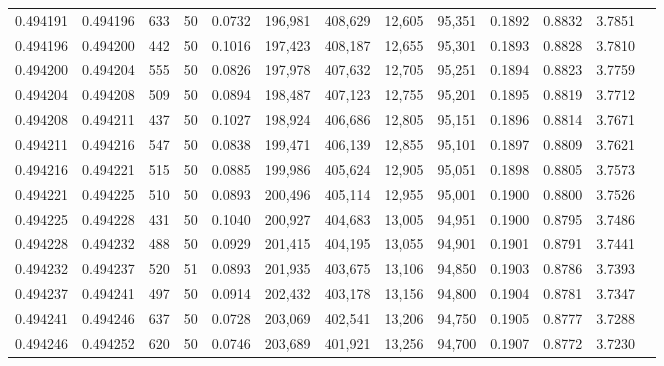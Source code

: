\begin{tabular}{rrrrrrrrrrrrr}
0.494191 & 0.494196 &   633 &  50 &                                     0.0732 & 196,981 & 408,629 &  12,605 &  95,351 & 0.1892 & 0.8832 & 3.7851 \\
0.494196 & 0.494200 &   442 &  50 &                                     0.1016 & 197,423 & 408,187 &  12,655 &  95,301 & 0.1893 & 0.8828 & 3.7810 \\
0.494200 & 0.494204 &   555 &  50 &                                     0.0826 & 197,978 & 407,632 &  12,705 &  95,251 & 0.1894 & 0.8823 & 3.7759 \\
0.494204 & 0.494208 &   509 &  50 &                                     0.0894 & 198,487 & 407,123 &  12,755 &  95,201 & 0.1895 & 0.8819 & 3.7712 \\
0.494208 & 0.494211 &   437 &  50 &                                     0.1027 & 198,924 & 406,686 &  12,805 &  95,151 & 0.1896 & 0.8814 & 3.7671 \\
0.494211 & 0.494216 &   547 &  50 &                                     0.0838 & 199,471 & 406,139 &  12,855 &  95,101 & 0.1897 & 0.8809 & 3.7621 \\
0.494216 & 0.494221 &   515 &  50 &                                     0.0885 & 199,986 & 405,624 &  12,905 &  95,051 & 0.1898 & 0.8805 & 3.7573 \\
0.494221 & 0.494225 &   510 &  50 &                                     0.0893 & 200,496 & 405,114 &  12,955 &  95,001 & 0.1900 & 0.8800 & 3.7526 \\
0.494225 & 0.494228 &   431 &  50 &                                     0.1040 & 200,927 & 404,683 &  13,005 &  94,951 & 0.1900 & 0.8795 & 3.7486 \\
0.494228 & 0.494232 &   488 &  50 &                                     0.0929 & 201,415 & 404,195 &  13,055 &  94,901 & 0.1901 & 0.8791 & 3.7441 \\
0.494232 & 0.494237 &   520 &  51 &                                     0.0893 & 201,935 & 403,675 &  13,106 &  94,850 & 0.1903 & 0.8786 & 3.7393 \\
0.494237 & 0.494241 &   497 &  50 &                                     0.0914 & 202,432 & 403,178 &  13,156 &  94,800 & 0.1904 & 0.8781 & 3.7347 \\
0.494241 & 0.494246 &   637 &  50 &                                     0.0728 & 203,069 & 402,541 &  13,206 &  94,750 & 0.1905 & 0.8777 & 3.7288 \\
0.494246 & 0.494252 &   620 &  50 &                                     0.0746 & 203,689 & 401,921 &  13,256 &  94,700 & 0.1907 & 0.8772 & 3.7230 \\

\end{tabular}
